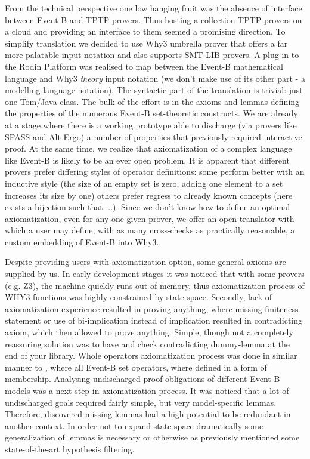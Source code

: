 \documentclass[twocolumn,a4paper,10pt]{article}
\begin{document}
From the technical perspective one low hanging fruit was the absence of interface between Event-B and TPTP provers. Thus hosting a collection TPTP provers on a cloud and providing an interface to them seemed a promising direction. To simplify translation we decided to use Why3 \cite{boogie11why3} umbrella prover that offers a far more palatable input notation and also supports SMT-LIB provers. A plug-in to the Rodin Platform was realised to map between the Event-B mathematical language and Why3 \emph{theory} input notation (we don't make use of its other part - a modelling language notation). The syntactic part of the translation is trivial: just one Tom/Java class. The bulk of the effort is in the axioms and lemmas defining the properties of the numerous Event-B set-theoretic constructs. We are already at a stage where there is a working prototype able to discharge (via provers like SPASS and Alt-Ergo) a number of properties that previously required interactive proof. At the same time, we realize that axiomatization of a complex language like Event-B is likely to be an ever open problem. It is apparent that different provers prefer differing styles of operator definitions: some perform better with an inductive style (the size of an empty set is zero, adding one element to a set increases its size by one) others prefer regress to already known concepts (here exists a bijection such that ...). Since we don't know how to define an optimal axiomatization, even for any one given prover, we offer an open translator with which a user may define, with as many cross-checks as practically reasonable, a custom embedding of Event-B into Why3.

Despite providing users with axiomatization option, some general axioms are supplied by us. In early development stages it was noticed that with some provers (e.g. Z3), the machine quickly runs out of memory, thus axiomatization process of WHY3 functions was highly constrained by state space. Secondly, lack of axiomatization experience resulted in proving anything, where missing finiteness statement or use of bi-implication instead of implication resulted in contradicting axiom, which then allowed to prove anything. Simple, though not a completely reassuring solution was to have and check contradicting dummy-lemma at the end of your library. Whole operators axiomatization process was done in similar manner to \cite{Discharg}, where all Event-B set operators, where defined in a form of membership. Analysing undischarged proof obligations of different Event-B models was a next step in axiomatization process. It was noticed that a lot of undischarged goals required fairly simple, but very model-specific lemmas. Therefore, discovered missing lemmas had a high potential to be redundant in another context. In order not to expand state space dramatically some generalization of lemmas is necessary or otherwise as previously mentioned some state-of-the-art hypothesis filtering.
\end{document}
